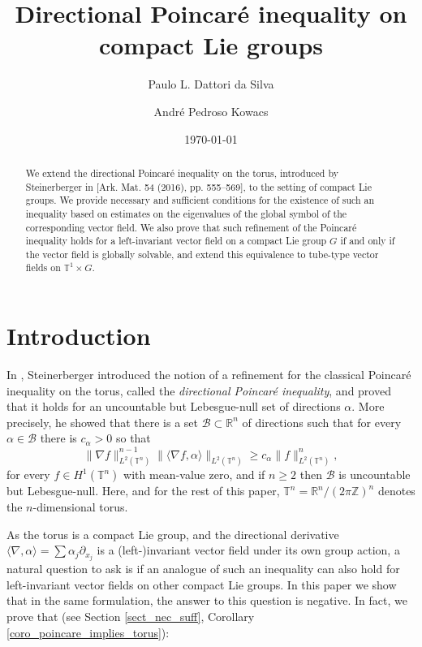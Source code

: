 \documentclass[11pt]{amsart}
\title[Directional Poincaré inequality on compact Lie groups]{Directional Poincaré inequality on compact Lie groups}
\author[P. L. Dattori da Silva]{Paulo L. Dattori da Silva}
\author[A. Kowacs]{André Pedroso Kowacs}
\date{\today}
\numberwithin{theorem}{section}
\numberwithin{equation}{section}
\theoremstyle{definition}
\numberwithin{example}{section}
\theoremstyle{definition}
\theoremstyle{definition}
\newcommand{\R}{\mathbb{R}}
\newcommand{\Z}{\mathbb{Z}}
\newcommand{\T}{\mathbb{T}}
\begin{document}
\begin{abstract}
    We extend the directional Poincaré inequality on the torus, introduced by Steinerberger  in [Ark. Mat. 54 (2016), pp. 555--569], to the setting of compact Lie groups. We provide necessary and sufficient conditions for the existence of such an inequality based on estimates on the eigenvalues of the global symbol of the corresponding vector field. 
    We also prove that such refinement of the Poincaré  inequality holds for a left-invariant vector field on a compact Lie group $G$ if and only if the vector field is globally solvable, and extend this equivalence to tube-type vector fields on $\T^1\times G$.
\end{abstract}
\maketitle

\section{Introduction}

In \cite{directional_Poincare}, Steinerberger introduced the notion of a refinement for the classical Poincaré inequality on the torus, called the {\it directional Poincaré inequality}, and proved that it holds for an uncountable but Lebesgue-null set of directions $\alpha$. More precisely, he showed that there is a set $\mathcal{B}\subset\mathbb{R}^n$ of directions such that for every $\alpha\in\mathcal{B}$ there is $c_\alpha>0$ so that
\begin{equation}\label{DPI_intro}
	\|\nabla f\|_{L^2(\mathbb{T}^n)}^{n-1}\| \langle \nabla f,\alpha\rangle \|_{L^2(\mathbb{T}^n)}\geq c_\alpha\|f\|_{L^2(\mathbb{T}^n)}^n, 
\end{equation}
for every $f\in H^1(\mathbb{T}^n)$ with mean-value zero, and if $n\geq2$ then $\mathcal{B}$ is uncountable but Lebesgue-null. Here, and for the rest of this paper, $\T^n=\R^n/(2\pi\Z)^n$ denotes the $n$-dimensional torus.

As the torus is a compact Lie group, and the directional derivative $\langle \nabla ,\alpha\rangle=\sum \alpha_j\partial_{x_j}$ is a (left-)invariant vector field under its own group action, a natural question to ask is if an analogue of such an inequality can also hold for left-invariant vector fields on other compact Lie groups.
In this paper we show that in the same formulation, the answer to this question is negative. In fact, we prove that (see Section \ref{sect_nec_suff}, Corollary \ref{coro_poincare_implies_torus}):
\end{document}
